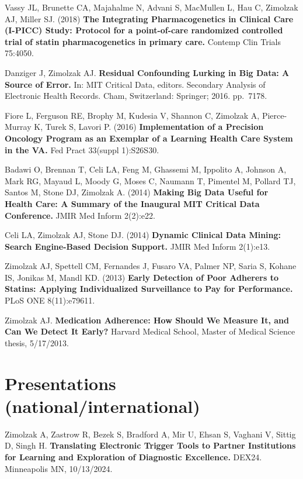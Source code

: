 \documentclass[10pt]{article}
\begin{document}
Vassy JL, Brunette CA, Majahalme N, Advani S, MacMullen L, Hau C,
Zimolzak AJ, Miller SJ. (2018) \textbf{The Integrating
  Pharmacogenetics in Clinical Care (I-PICC) Study: Protocol for a
  point-of-care randomized controlled trial of statin pharmacogenetics
  in primary care.} Contemp Clin Trials 75:40\ndash{}50.

Danziger J, Zimolzak AJ. \textbf{Residual Confounding Lurking in Big
  Data: A Source of Error.} In: MIT Critical Data, editors. Secondary
Analysis of Electronic Health Records. Cham, Switzerland: Springer;
2016. pp.\ 71\ndash{}78.

Fiore L, Ferguson RE, Brophy M, Kudesia V, Shannon C, Zimolzak A,
Pierce-Murray K, Turek S, Lavori P. (2016) \textbf{Implementation of a
  Precision Oncology Program as an Exemplar of a Learning Health Care
  System in the VA.} Fed Pract 33(suppl 1):S26\ndash{}S30.

Badawi O, Brennan T, Celi LA, Feng M, Ghassemi M, Ippolito A, Johnson
A, Mark RG, Mayaud L, Moody G, Moses C, Naumann T, Pimentel M, Pollard
TJ, Santos M, Stone DJ, Zimolzak A. (2014) \textbf{Making Big Data
  Useful for Health Care: A Summary of the Inaugural MIT Critical Data
  Conference.} JMIR Med Inform 2(2):e22.

Celi LA, Zimolzak AJ, Stone DJ. (2014) \textbf{Dynamic Clinical Data
  Mining: Search Engine-Based Decision Support.} JMIR Med Inform
2(1):e13.

Zimolzak AJ, Spettell CM, Fernandes J, Fusaro VA, Palmer NP, Saria S,
Kohane IS, Jonikas M, Mandl KD. (2013) \textbf{Early Detection of Poor
  Adherers to Statins: Applying Individualized Surveillance to Pay for
  Performance.} PLoS ONE 8(11):e79611.

Zimolzak AJ. \textbf{Medication Adherence: How Should We Measure It,
  and Can We Detect It Early?} Harvard Medical School, Master of
Medical Science thesis, 5/17/2013.




\section*{Presentations (national/international)} %


Zimolzak A, Zastrow R, Bezek S, Bradford A, Mir U, Ehsan S, Vaghani V,
Sittig D, Singh H. \textbf{Translating Electronic Trigger Tools to
  Partner Institutions for Learning and Exploration of Diagnostic
  Excellence.} DEX24. Minneapolis MN, 10/13/2024.
\end{document}
